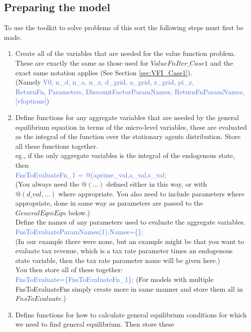 \subsection{Preparing the model}
To use the toolkit to solve problems of this sort the following steps must first be made.
\begin{enumerate}
 \item Create all of the variables that are needed for the value function problem. These are exactly the same as those used for
   $ValueFnIter\_{}Case1$ and the exact same notation applies (See Section \ref{sec:VFI_Case1}). \\
    (Namely \textcolor{RoyalBlue}{V0, n\_{}d, n\_{}a, n\_{}z, d\_{}grid, a\_{}grid, z\_{}grid, pi\_{}z,} \\
    \indent \textcolor{RoyalBlue}{ReturnFn, Parameters, DiscountFactorParamNames, ReturnFnParamNames, [vfoptions]})
 \item Define functions for any aggregate variables that are needed by the general equilibrium equation in terms of the micro-level variables, these
   are evaluated as the integral of the function over the stationary agents distribution. Store all these functions together. \\
   eg., if the only aggregate variables is the integral of the endogenous state, then \\
   \textcolor{RoyalBlue}{FnsToEvaluateFn\_{}1 = @(aprime\_{}val,a\_{}val,s\_{}val;} \\
   (You always need the $@(...)$ defined either in this way, or with $@(d\_{}val,...)$ where appropriate. You also need to include parameters where appropriate, done in same way
   as parameters are passed to the $GeneralEqmEqn$ below.) \\
   Define the names of any parameters used to evaluate the aggregate variables. \\
   \textcolor{RoyalBlue}{FnsToEvaluateParamNames(1).Names=\{\};} \\
   (In our example there were none, but an example might be that you want to evaluate tax revenue, which is a tax rate parameter times an endogenous state variable, then the tax rate
    parameter name will be given here.) \\
   You then store all of these together: \\
   \textcolor{RoyalBlue}{FnsToEvaluate=\{FnsToEvaluateFn\_{}1\};}
   (For models with multiple FnsToEvaluateFns simply create more in same manner and store them all in $FnsToEvaluate$.)
 \item Define functions for how to calculate general equilibrium conditions for which we need to find general equilibrium. Then store these

\end{enumerate}
